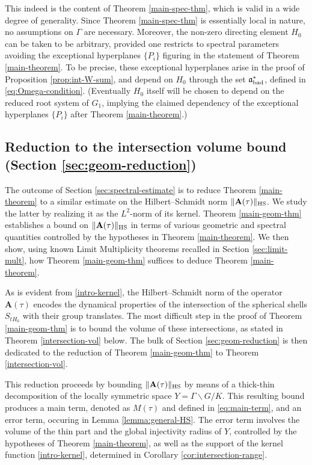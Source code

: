 \documentclass[12pt]{amsart}
\theoremstyle{remark}
\begin{document}
This indeed is the content of Theorem \ref{main-spec-thm}, which is valid in a wide degree of generality. Since Theorem \ref{main-spec-thm} is essentially local in nature, no assumptions on $\Gamma$ are necessary. Moreover, the non-zero directing element $H_0$ can be taken to be arbitrary, provided one restricts to spectral parameters avoiding the exceptional hyperplanes $\{P_i\}$ figuring in the statement of Theorem \ref{main-theorem}. To be precise, these exceptional hyperplanes arise in the proof of Proposition \ref{prop:int-W-sum}, and depend on $H_0$ through the set $\mathfrak{a}_{\rm bad}^*$, defined in \eqref{eq:Omega-condition}. (Eventually $H_0$ itself will be chosen to depend on the reduced root system of $G_1$, implying the claimed dependency of the exceptional hyperplanes $\{P_i\}$ after Theorem \ref{main-theorem}.)


\subsection*{Reduction to the intersection volume bound (Section \ref{sec:geom-reduction})}
The outcome of Section \ref{sec:spectral-estimate} is to reduce Theorem \ref{main-theorem} to a similar estimate on the Hilbert--Schmidt norm $\|\mathbf{A}(\tau)\|_{{\rm HS}}$. We study the latter by realizing it as the $L^2$-norm of its kernel. Theorem \ref{main-geom-thm} establishes a bound on $\|\mathbf{A}(\tau)\|_{{\rm HS}}$ in terms of various geometric and spectral quantities controlled by the hypotheses in Theorem \ref{main-theorem}. We then show, using known Limit Multiplicity theorems recalled in Section \ref{sec:limit-mult}, how Theorem \ref{main-geom-thm} suffices to deduce Theorem \ref{main-theorem}.

As is evident from \eqref{intro-kernel}, the Hilbert--Schmidt norm of the operator $\mathbf{A}(\tau)$ encodes the dynamical properties of the intersection of the spherical shells $S_{tH_0}$ with their group translates. The most difficult step in the proof of Theorem \ref{main-geom-thm} is to bound the volume of these intersections, as stated in Theorem \ref{intersection-vol} below. The bulk of Section \ref{sec:geom-reduction} is then dedicated to the reduction of Theorem \ref{main-geom-thm} to Theorem \ref{intersection-vol}.

This reduction proceeds by bounding $\|\mathbf{A}(\tau)\|_{{\rm HS}}$ by means of a thick-thin decomposition of the locally symmetric space $Y=\Gamma\backslash G/K$. This resulting bound produces a main term, denoted as $M(\tau)$ and defined in \eqref{eq:main-term}, and an error term, occuring in Lemma \ref{lemma:general-HS}. The error term involves the volume of the thin part and the global injectivity radius of $Y$, controlled by the hypotheses of Theorem \ref{main-theorem}, as well as the support of the kernel function \eqref{intro-kernel}, determined in Corollary \ref{cor:intersection-range}.
\end{document}

